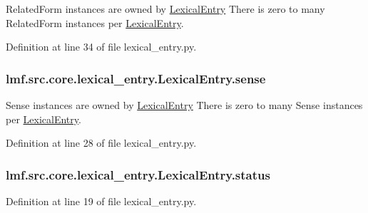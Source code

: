 Related\+Form instances are owned by \hyperlink{classlmf_1_1src_1_1core_1_1lexical__entry_1_1_lexical_entry}{Lexical\+Entry} There is zero to many Related\+Form instances per \hyperlink{classlmf_1_1src_1_1core_1_1lexical__entry_1_1_lexical_entry}{Lexical\+Entry}. 



Definition at line 34 of file lexical\+\_\+entry.\+py.

\hypertarget{classlmf_1_1src_1_1core_1_1lexical__entry_1_1_lexical_entry_a92b1d39e09a8af1a90e780ef5780cc92}{
\subsubsection[{sense}]{\setlength{\rightskip}{0pt plus 5cm}lmf.\+src.\+core.\+lexical\+\_\+entry.\+Lexical\+Entry.\+sense}}\label{classlmf_1_1src_1_1core_1_1lexical__entry_1_1_lexical_entry_a92b1d39e09a8af1a90e780ef5780cc92}


Sense instances are owned by \hyperlink{classlmf_1_1src_1_1core_1_1lexical__entry_1_1_lexical_entry}{Lexical\+Entry} There is zero to many Sense instances per \hyperlink{classlmf_1_1src_1_1core_1_1lexical__entry_1_1_lexical_entry}{Lexical\+Entry}. 



Definition at line 28 of file lexical\+\_\+entry.\+py.

\hypertarget{classlmf_1_1src_1_1core_1_1lexical__entry_1_1_lexical_entry_aaec5fa141d51ae38a0346b0f863f4522}{
\subsubsection[{status}]{\setlength{\rightskip}{0pt plus 5cm}lmf.\+src.\+core.\+lexical\+\_\+entry.\+Lexical\+Entry.\+status}}\label{classlmf_1_1src_1_1core_1_1lexical__entry_1_1_lexical_entry_aaec5fa141d51ae38a0346b0f863f4522}


Definition at line 19 of file lexical\+\_\+entry.\+py.

